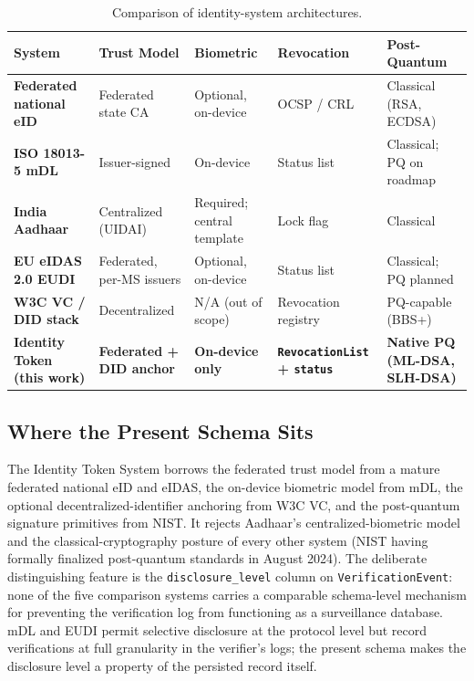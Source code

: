 \documentclass[11pt,letterpaper]{article}
\newcommand{\entity}[1]{\texttt{\color{navydark}#1}}
\newcommand{\thead}[1]{\textbf{\color{white}\small #1}}
\begin{document}
\begin{table}[H]
\centering
\footnotesize
\caption{Comparison of identity-system architectures.}
\setlength{\tabcolsep}{4pt}
\renewcommand{\arraystretch}{1.15}
\begin{tabularx}{\textwidth}{>{\bfseries\RaggedRight\arraybackslash}p{1.4in} >{\RaggedRight\arraybackslash}p{1.05in} >{\RaggedRight\arraybackslash}p{0.95in} >{\RaggedRight\arraybackslash}p{0.95in} >{\RaggedRight\arraybackslash}X}
\toprule
\rowcolor{tabheader}
\thead{System} & \thead{Trust Model} & \thead{Biometric} & \thead{Revocation} & \thead{Post-Quantum} \\
\midrule
Federated national eID  & Federated state CA & Optional, on-device & OCSP / CRL & Classical (RSA, ECDSA) \\
ISO 18013-5 mDL       & Issuer-signed & On-device & Status list & Classical; PQ on roadmap \\
India Aadhaar         & Centralized (UIDAI) & Required; central template & Lock flag & Classical \\
EU eIDAS 2.0 EUDI     & Federated, per-MS issuers & Optional, on-device & Status list & Classical; PQ planned \\
W3C VC / DID stack    & Decentralized & N/A (out of scope) & Revocation registry & PQ-capable (BBS+) \\
\midrule
\rowcolor{tabstripe}
\textbf{Identity Token (this work)} & \textbf{Federated + DID anchor} & \textbf{On-device only} & \textbf{\entity{RevocationList} + \texttt{status}} & \textbf{Native PQ (ML-DSA, SLH-DSA)} \\
\bottomrule
\end{tabularx}
\end{table}

\subsection*{Where the Present Schema Sits}

The Identity Token System borrows the federated trust model from a mature federated national eID and eIDAS, the on-device biometric model from mDL, the optional decentralized-identifier anchoring from W3C VC, and the post-quantum signature primitives from NIST. It rejects Aadhaar's centralized-biometric model and the classical-cryptography posture of every other system (NIST having formally finalized post-quantum standards in August 2024). The deliberate distinguishing feature is the \texttt{disclosure\_level} column on \entity{VerificationEvent}: none of the five comparison systems carries a comparable schema-level mechanism for preventing the verification log from functioning as a surveillance database. mDL and EUDI permit selective disclosure at the protocol level but record verifications at full granularity in the verifier's logs; the present schema makes the disclosure level a property of the persisted record itself.
\end{document}
